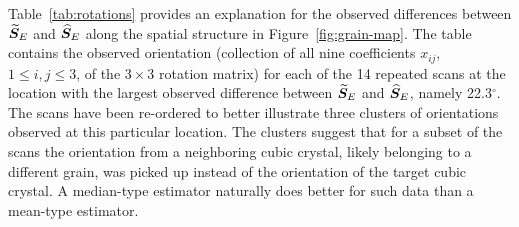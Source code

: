 Table~\ref{tab:rotations} provides an explanation for the observed differences between ${\widetilde{\bm S}_E}$ and ${\widehat{\bm S}_E}$ along the spatial structure in Figure~\ref{fig:grain-map}. The table contains the observed orientation (collection of all nine coefficients $x_{ij}$, $1 \le i,j \le 3$, of the $3\times 3$ rotation matrix) for each of the 14 repeated scans at the location with the largest observed difference between ${\widetilde{\bm S}_E}$ and ${\widehat{\bm S}_E}$, namely 22.3$^\circ$.   The scans have been re-ordered to better illustrate  three clusters of orientations observed at this particular location. The clusters suggest that for a subset of the scans the orientation from a neighboring cubic crystal, likely belonging to a different grain, was picked up instead of the orientation of the   target cubic crystal. A median-type estimator naturally does better for such data than a mean-type estimator.  
